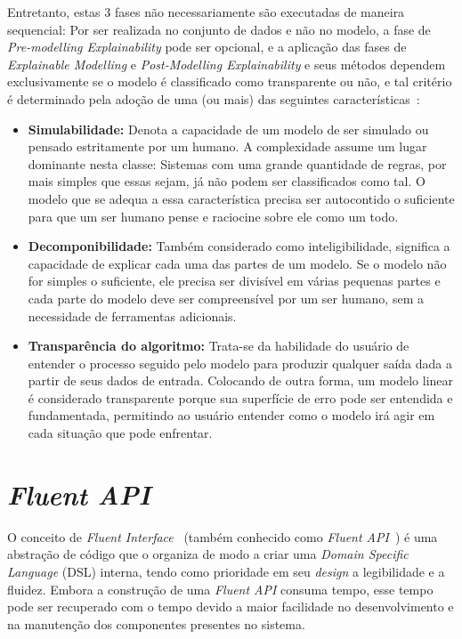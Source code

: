 \documentclass[portugues]{ic-tese}
\begin{document}
Entretanto, estas 3 fases não necessariamente são executadas de maneira sequencial: Por ser realizada no conjunto de dados e não no modelo, a fase de \textit{Pre-modelling Explainability} pode ser opcional, e a aplicação das fases de \textit{Explainable Modelling} e \textit{Post-Modelling Explainability} e seus métodos dependem exclusivamente se o modelo é classificado como transparente ou não, e tal critério é determinado pela adoção de uma (ou mais) das seguintes características~\citep{Arrieta_2020}:

\begin{itemize}
\item \textbf{Simulabilidade:} Denota a capacidade de um modelo de ser simulado ou pensado estritamente por um humano. A complexidade assume um lugar dominante nesta classe: Sistemas com uma grande quantidade de regras, por mais simples que essas sejam, já não podem ser classificados como tal. O modelo que se adequa a essa característica precisa ser autocontido o suficiente para que um ser humano pense e raciocine sobre ele como um todo.
\item \textbf{Decomponibilidade:} Também considerado como inteligibilidade, significa a capacidade de explicar cada uma das partes de um modelo. Se o modelo não for simples o suficiente, ele precisa ser divisível em várias pequenas partes e cada parte do modelo deve ser compreensível por um ser humano, sem a necessidade de ferramentas adicionais.
\item \textbf{Transparência do algoritmo:} Trata-se da habilidade do usuário de entender o processo seguido pelo modelo para produzir qualquer saída dada a partir de seus dados de entrada. Colocando de outra forma, um modelo linear é considerado transparente porque sua superfície de erro pode ser entendida e fundamentada, permitindo ao usuário entender como o modelo irá agir em cada situação que pode enfrentar.
\end{itemize}

\section{\textit{Fluent API}}
\label{app:FluentAPI}

O conceito de \textit{Fluent Interface}~\citep{Fowler_2005} (também conhecido como \textit{Fluent API}~\citep{Nakamaru_2020}) é uma abstração de código que o organiza de modo a criar uma \textit{Domain Specific Language} (DSL) interna, tendo como prioridade em seu \textit{design} a legibilidade e a fluidez. Embora a construção de uma \textit{Fluent API} consuma tempo, esse tempo pode ser recuperado com o tempo devido a maior facilidade no desenvolvimento e na manutenção dos componentes presentes no sistema.
\end{document}
